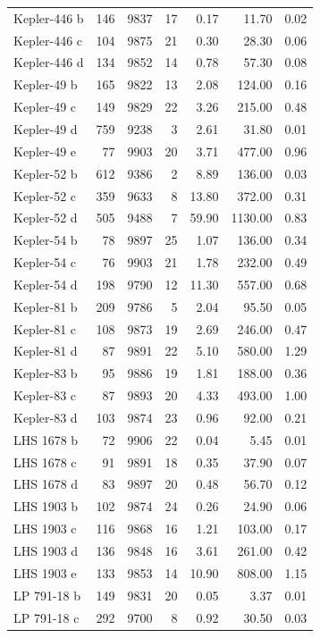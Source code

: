 \begin{table}
\begin{tabular}{lrrrrrr}
Kepler-446 b & 146 & 9837 & 17 & 0.17 & 11.70 & 0.02 \\
Kepler-446 c & 104 & 9875 & 21 & 0.30 & 28.30 & 0.06 \\
Kepler-446 d & 134 & 9852 & 14 & 0.78 & 57.30 & 0.08 \\
Kepler-49 b & 165 & 9822 & 13 & 2.08 & 124.00 & 0.16 \\
Kepler-49 c & 149 & 9829 & 22 & 3.26 & 215.00 & 0.48 \\
Kepler-49 d & 759 & 9238 & 3 & 2.61 & 31.80 & 0.01 \\
Kepler-49 e & 77 & 9903 & 20 & 3.71 & 477.00 & 0.96 \\
Kepler-52 b & 612 & 9386 & 2 & 8.89 & 136.00 & 0.03 \\
Kepler-52 c & 359 & 9633 & 8 & 13.80 & 372.00 & 0.31 \\
Kepler-52 d & 505 & 9488 & 7 & 59.90 & 1130.00 & 0.83 \\
Kepler-54 b & 78 & 9897 & 25 & 1.07 & 136.00 & 0.34 \\
Kepler-54 c & 76 & 9903 & 21 & 1.78 & 232.00 & 0.49 \\
Kepler-54 d & 198 & 9790 & 12 & 11.30 & 557.00 & 0.68 \\
Kepler-81 b & 209 & 9786 & 5 & 2.04 & 95.50 & 0.05 \\
Kepler-81 c & 108 & 9873 & 19 & 2.69 & 246.00 & 0.47 \\
Kepler-81 d & 87 & 9891 & 22 & 5.10 & 580.00 & 1.29 \\
Kepler-83 b & 95 & 9886 & 19 & 1.81 & 188.00 & 0.36 \\
Kepler-83 c & 87 & 9893 & 20 & 4.33 & 493.00 & 1.00 \\
Kepler-83 d & 103 & 9874 & 23 & 0.96 & 92.00 & 0.21 \\
LHS 1678 b & 72 & 9906 & 22 & 0.04 & 5.45 & 0.01 \\
LHS 1678 c & 91 & 9891 & 18 & 0.35 & 37.90 & 0.07 \\
LHS 1678 d & 83 & 9897 & 20 & 0.48 & 56.70 & 0.12 \\
LHS 1903 b & 102 & 9874 & 24 & 0.26 & 24.90 & 0.06 \\
LHS 1903 c & 116 & 9868 & 16 & 1.21 & 103.00 & 0.17 \\
LHS 1903 d & 136 & 9848 & 16 & 3.61 & 261.00 & 0.42 \\
LHS 1903 e & 133 & 9853 & 14 & 10.90 & 808.00 & 1.15 \\
LP 791-18 b & 149 & 9831 & 20 & 0.05 & 3.37 & 0.01 \\
LP 791-18 c & 292 & 9700 & 8 & 0.92 & 30.50 & 0.03 \\

\end{tabular}
\end{table}
